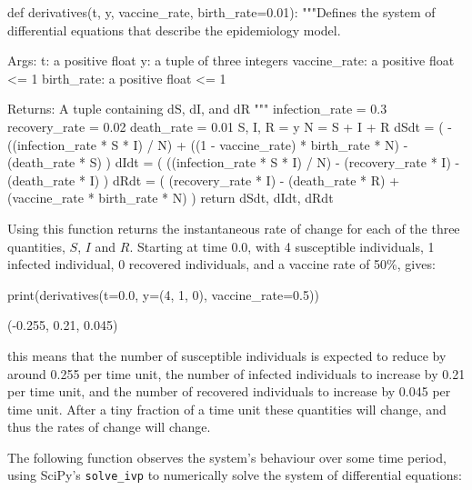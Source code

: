 \begin{pyin}
def derivatives(t, y, vaccine_rate, birth_rate=0.01):
    """Defines the system of differential equations that describe
    the epidemiology model.

    Args:
        t: a positive float
        y: a tuple of three integers
        vaccine_rate: a positive float <= 1
        birth_rate: a positive float <= 1

    Returns:
        A tuple containing dS, dI, and dR
    """
    infection_rate = 0.3
    recovery_rate = 0.02
    death_rate = 0.01
    S, I, R = y
    N = S + I + R
    dSdt = (
        -((infection_rate * S * I) / N)
        + ((1 - vaccine_rate) * birth_rate * N)
        - (death_rate * S)
    )
    dIdt = (
        ((infection_rate * S * I) / N)
        - (recovery_rate * I)
        - (death_rate * I)
    )
    dRdt = (
        (recovery_rate * I)
        - (death_rate * R)
        + (vaccine_rate * birth_rate * N)
    )
    return dSdt, dIdt, dRdt
\end{pyin}

Using this function returns the instantaneous rate of change for each of the
three quantities, $S$, $I$ and $R$. Starting at time 0.0, with 4 susceptible
individuals, 1 infected individual, 0 recovered individuals, and a vaccine rate
of 50\%, gives:

\begin{pyin}
print(derivatives(t=0.0, y=(4, 1, 0), vaccine_rate=0.5))
\end{pyin}

\begin{pyout}
(-0.255, 0.21, 0.045)
\end{pyout}

this means that the number of susceptible individuals is expected to reduce by
around 0.255 per time unit, the number of infected individuals to increase by
0.21 per time unit, and the number of recovered individuals to increase by 0.045
per time unit. After a tiny fraction of a time unit these quantities will
change, and thus the rates of change will change.

The following function observes the system's behaviour over some time period,
using SciPy's \texttt{solve_ivp} to numerically solve the system
of differential equations:

